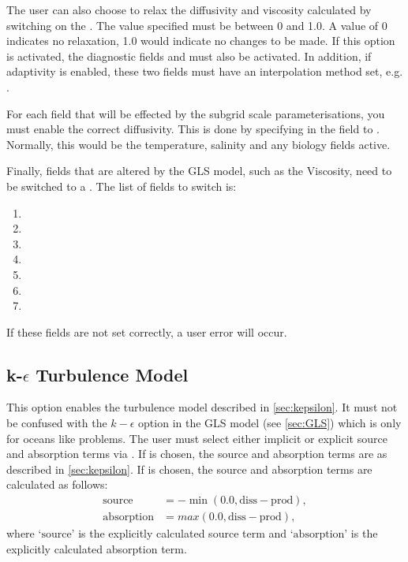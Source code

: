 The user can also choose to relax the diffusivity and viscosity calculated by switching on the\linebreak
{}. The value specified must be between 0 and 1.0. A value of 0 indicates
no relaxation, 1.0 would indicate no changes to be made. If this option is activated, the diagnostic fields
 and  must also
be activated. In addition, if adaptivity is enabled, these two fields must have an interpolation
method set, e.g. .

For each field that will be effected by the subgrid scale parameterisations, 
you must enable the correct diffusivity. This
is done by specifying  in the
field to . Normally, this would be the temperature, salinity and any biology fields active.

Finally, fields that are altered by the GLS model, such as the Viscosity, need to be switched
to a . The list of fields to switch is:
\begin{enumerate}
\item {}
\item {}
\item {}
\item {}
\item {}
\item {}
\item {}
\end{enumerate}

If these fields are not set correctly, a user error will occur.

\subsection{k-$\epsilon$ Turbulence Model}\label{sec:kepsilon_usage}

This option enables the turbulence model described in \ref{sec:kepsilon}. It must not be confused with the
$k-\epsilon$ option in the GLS model (see \ref{sec:GLS}) which is only for oceans like problems.
The user must select either implicit or explicit source and absorption terms via .
If  is chosen, the source and absorption terms are as described in \ref{sec:kepsilon}.
If  is chosen, the source and absorption terms are calculated as follows:
\begin{align*}
\textrm{source} &= -\min(0.0, \textrm{diss}-\textrm{prod}), \\
\textrm{absorption} &= max(0.0, \textrm{diss}-\textrm{prod}), 
\end{align*}
where `$\textrm{source}$' is the explicitly calculated source term and `$\textrm{absorption}$' is the explicitly calculated absorption term. 

